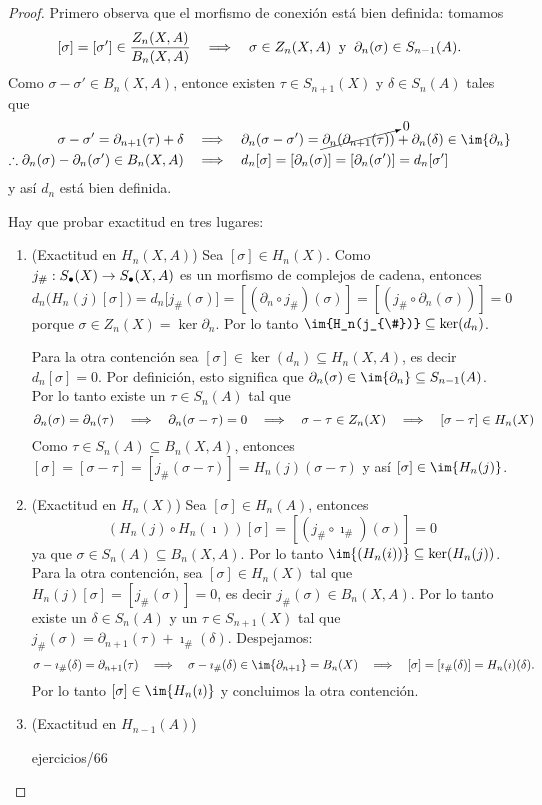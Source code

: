 \documentclass[../../topologia_algebraica]{subfiles}
\begin{document}
\begin{proof}
  Primero observa que el morfismo de conexi\'on est\'a bien definida: tomamos
  \[
    [\sigma]=[\sigma'] \in\frac{Z_n(X,A)}{B_n(X,A)} \quad\Longrightarrow\quad
    \sigma\in Z_n(X,A) \;\;\text{y}\;\; \partial_n(\sigma)\in S_{n-1}(A).
  \]
  Como $\sigma-\sigma'\in B_n(X,A)$, entonce existen $\tau\in S_{n+1}(X)$ y $\delta\in S_n(A)$ tales que
  \begin{align*}
    \sigma-\sigma'=\partial_{n+1}(\tau)+\delta &\quad\then\quad \partial_n(\sigma-\sigma')=
    \cancelto{0}{\partial_n(\partial_{n+1}(\tau))}+\partial_n(\delta)\in \im{\partial_n}\\
    \therefore \partial_n(\sigma)-\partial_n(\sigma')\in B_n(X,A) &\quad\then\quad d_n[\sigma]=
    [\partial_n(\sigma)]=[\partial_n(\sigma')]=d_n[\sigma']
  \end{align*}
  y as\'i $d_n$ est\'a bien definida.

  Hay que probar exactitud en tres lugares:
\begin{enumerate}
\item(Exactitud en $H_n(X,A)$) Sea $[\sigma]\in H_n(X)$. Como $j_{\#}:S_{\bullet}(X)\rightarrow S_{\bullet}(X,A)$
  es un morfismo de complejos de cadena, entonces
  \[
    d_n\big(H_n(j)[\sigma]\big) =d_n\big[j_{\#}(\sigma)\big] =
    [ (\partial_n\circ j_{\#})(\sigma)]=[(j_{\#}\circ\partial_n(\sigma))]=0
  \]
  porque $\sigma\in Z_n(X)=\ker\partial_n$. Por lo tanto $\im{H_n(j_{\#})}\subseteq \ker(d_n)$.
	
  Para la otra contenci\'on sea $[\sigma]\in\ker(d_n)\subseteq H_n(X,A)$, es decir $d_n[\sigma]=0$.
  Por definici\'on, esto significa que $\partial_n(\sigma)\in\im{\partial_n}\subseteq S_{n-1}(A)$.
  Por lo tanto existe un $\tau\in S_n(A)$ tal que
  \[
    \partial_n(\sigma)=\partial_n(\tau) \quad\Longrightarrow\quad
    \partial_n(\sigma-\tau)=0 \quad\Longrightarrow\quad
    \sigma-\tau\in Z_n(X) \quad\Longrightarrow\quad
    [\sigma-\tau]\in H_n(X)
  \]
  Como $\tau\in S_n(A)\subseteq B_n(X,A)$, entonces
  $[\sigma]=[\sigma-\tau]=[j_{\#}(\sigma-\tau)]=H_n(j)(\sigma-\tau)$ y as\'i $[\sigma]\in\im{H_n(j)}$.

\item(Exactitud en $H_n(X)$) Sea $[\sigma]\in H_n(A)$, entonces
  \[
    (H_n(j)\circ H_n(\imath))[\sigma]=[(j_{\#}\circ \imath_{\#})(\sigma)]=0
  \]
  ya que $\sigma\in S_n(A)\subseteq B_n(X,A)$. Por lo tanto $\im{(H_n(i))}\subseteq \ker(H_n(j))$.
  Para la otra contenci\'on, sea $[\sigma]\in H_n(X)$ tal que $H_n(j)[\sigma]=[j_{\#}(\sigma)]=0$,
  es decir $j_{\#}(\sigma)\in B_n(X,A)$. Por lo tanto existe un $\delta\in S_n(A)$ y un
  $\tau\in S_{n+1}(X)$ tal que $j_{\#}(\sigma)=\partial_{n+1}(\tau)+\imath_{\#}(\delta)$.
  Despejamos:
  \[
    \sigma-\imath_{\#}(\delta)=\partial_{n+1}(\tau) \quad\then\quad
    \sigma-\imath_{\#}(\delta) \in \im{\partial_{n+1}}=B_n(X) \quad\then\quad
    [\sigma]=[\imath_{\#}(\delta)]=H_n(\imath)(\delta).
  \]
  Por lo tanto $[\sigma]\in\im{H_n(\imath)}$ y concluimos la otra contenci\'on.

\item(Exactitud en $H_{n-1}(A)$)

{ejercicios/66} %
\end{enumerate}
\end{proof}
\end{document}
